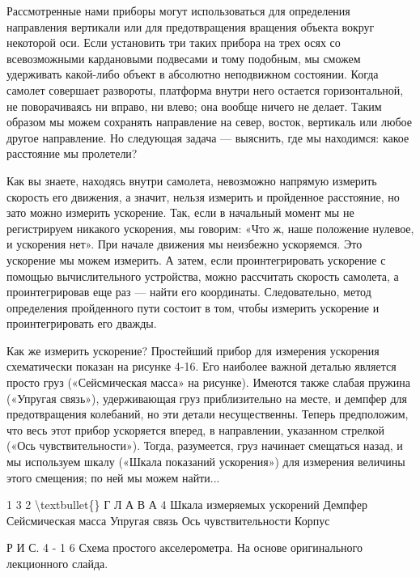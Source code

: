 \documentclass[10pt,oneside]{article}
\newcommand{\TipsSubsection}[1]{\par\vspace{6bp}{\normalsize\bfseries #1\par}\vspace{2bp}}
\begin{document}
\TipsSubsection{4-7 Акселерометры}

Рассмотренные нами приборы могут использоваться для определения направления вертикали или для предотвращения вращения объекта вокруг некоторой оси. Если установить три таких прибора на трех осях со всевозможными кардановыми подвесами и тому подобным, мы сможем удерживать какой-либо объект в абсолютно неподвижном состоянии. Когда самолет совершает развороты, платформа внутри него остается горизонтальной, не поворачиваясь ни вправо, ни влево; она вообще ничего не делает. Таким образом мы можем сохранять направление на север, восток, вертикаль или любое другое направление. Но следующая задача --- выяснить, где мы находимся: какое расстояние мы пролетели?\par

Как вы знаете, находясь внутри самолета, невозможно напрямую измерить скорость его движения, а значит, нельзя измерить и пройденное расстояние, но зато можно измерить ускорение. Так, если в начальный момент мы не регистрируем никакого ускорения, мы говорим: «Что ж, наше положение нулевое, и ускорения нет». При начале движения мы неизбежно ускоряемся. Это ускорение мы можем измерить. А затем, если проинтегрировать ускорение с помощью вычислительного устройства, можно рассчитать скорость самолета, а проинтегрировав еще раз --- найти его координаты. Следовательно, метод определения пройденного пути состоит в том, чтобы измерить ускорение и проинтегрировать его дважды.\par

Как же измерить ускорение? Простейший прибор для измерения ускорения схематически показан на рисунке 4-16. Его наиболее важной деталью является просто груз («Сейсмическая масса» на рисунке). Имеются также слабая пружина («Упругая связь»), удерживающая груз приблизительно на месте, и демпфер для предотвращения колебаний, но эти детали несущественны. Теперь предположим, что весь этот прибор ускоряется вперед, в направлении, указанном стрелкой («Ось чувствительности»). Тогда, разумеется, груз начинает смещаться назад, и мы используем шкалу («Шкала показаний ускорения») для измерения величины этого смещения; по ней мы можем найти...\par

1 3 2 \textbackslash{}textbullet\{\} Г Л А В А  4 Шкала измеряемых ускорений Демпфер Сейсмическая масса Упругая связь Ось чувствительности Корпус\par

Р И С.  4 - 1 6 Схема простого акселерометра. На основе оригинального лекционного слайда.\par
\end{document}
